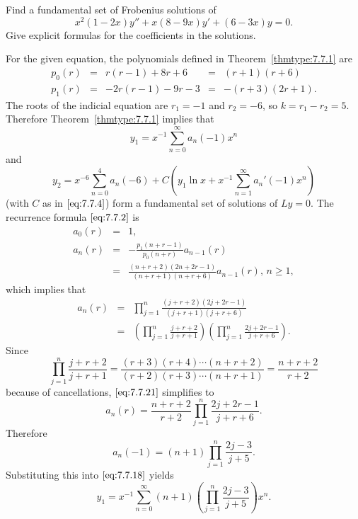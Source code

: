 \documentclass{ximera}
\begin{document}
\begin{example}\label{example:7.7.2}
Find a fundamental set of Frobenius  solutions of
$$
x^2(1-2x)y''+x(8-9x)y'+(6-3x)y=0.
$$
Give explicit formulas for the coefficients in the solutions.

\begin{explanation}
For  the given equation, the polynomials defined in
Theorem~\ref{thmtype:7.7.1} are
$$
\begin{array}{ccccc}
p_0(r)&=&r(r-1)+8r+6&=&(r+1)(r+6)\\
p_1(r)&=&-2r(r-1)-9r-3&=&-(r+3)(2r+1).
\end{array}
$$
The roots of the indicial equation  are $r_1=-1$ and $r_2=-6$,
so $k=r_1-r_2=5$. Therefore Theorem~\ref{thmtype:7.7.1} implies that
\begin{equation} \label{eq:7.7.18}
y_1=x^{-1}\sum_{n=0}^\infty a_n(-1)x^n
\end{equation}
and
\begin{equation} \label{eq:7.7.19}
y_2=x^{-6}\sum_{n=0}^4a_n(-6)+C\left(y_1\ln
x+x^{-1}\sum_{n=1}^\infty a_n'(-1)x^n\right)
\end{equation}
(with $C$ as in $\eqref{eq:7.7.4}$)
form a fundamental set of solutions of $Ly=0$. The
recurrence formula $\eqref{eq:7.7.2}$ is
\begin{equation} \label{eq:7.7.20}
\begin{array}{ccl}
a_0(r)&=&1,\\
a_n(r)&=&-\frac{p_1(n+r-1)}{p_0(n+r)}a_{n-1}(r)\\
&=&\frac{(n+r+2)(2n+2r-1)}{(n+r+1)(n+r+6)}a_{n-1}(r),\,n\geq 1,
\end{array}
\end{equation}
which implies that
\begin{equation} \label{eq:7.7.21}
\begin{array}{ccl}
a_n(r)&=&\prod_{j=1}^n\frac{(j+r+2)(2j+2r-1)}{(j+r+1)(j+r+6)}\\
&=&\left(\prod_{j=1}^n\frac{j+r+2}{j+r+1}\right)
\left(\prod_{j=1}^n\frac{2j+2r-1}{j+r+6}\right).
\end{array}
\end{equation}
Since
$$
\prod_{j=1}^n\frac{j+r+2}{j+r+1}=\frac{(r+3)(r+4)\cdots(n+r+2)}{(r+2)(r+3)\cdots(n+r+1)}=\frac{n+r+2}{r+2}
$$
because of cancellations, $\eqref{eq:7.7.21}$ simplifies to
$$
a_n(r)=\frac{n+r+2}{r+2}\prod_{j=1}^n\frac{2j+2r-1}{j+r+6}.
$$
Therefore
$$
a_n(-1)=(n+1)\prod_{j=1}^n\frac{2j-3}{j+5}.
$$
Substituting this into $\eqref{eq:7.7.18}$ yields
$$
y_1=x^{-1}\sum_{n=0}^\infty (n+1)\left(\prod_{j=1}^n\frac{2j-3}{j+5}\right) x^n.
$$


\end{explanation}
\end{example}
\end{document}
